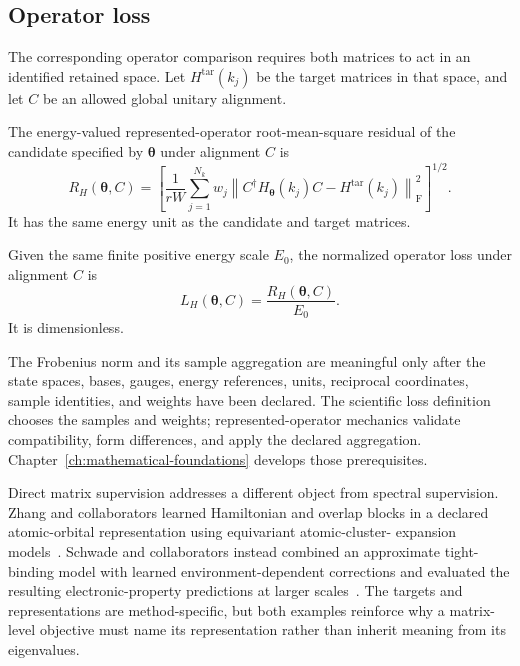 \subsection{Operator loss}

The corresponding operator comparison requires both matrices to act in an
identified retained space. Let $H^{\mathrm{tar}}(k_j)$ be the target matrices
in that space, and let $C$ be an allowed global unitary alignment.

\begin{definition}
The energy-valued represented-operator root-mean-square residual of the
candidate specified by $\boldsymbol\theta$ under alignment $C$ is
\begin{equation}
  R_H(\boldsymbol\theta,C)
  =
  \left[
    \frac{1}{rW}
    \sum_{j=1}^{N_k}w_j
    \left\|
      C^{\dagger}H_{\boldsymbol\theta}(k_j)C
      -H^{\mathrm{tar}}(k_j)
    \right\|_{\mathrm F}^{2}
  \right]^{1/2}.
  \label{eq:admissible-operator-rms-residual}
\end{equation}
It has the same energy unit as the candidate and target matrices.
\end{definition}

\begin{definition}
Given the same finite positive energy scale $E_0$, the normalized operator
loss under alignment $C$ is
\begin{equation}
  L_H(\boldsymbol\theta,C)
  =
  \frac{R_H(\boldsymbol\theta,C)}{E_0}.
  \label{eq:admissible-operator-rms}
\end{equation}
It is dimensionless.
\end{definition}

The Frobenius norm and its sample aggregation are meaningful only after the
state spaces, bases, gauges, energy references, units, reciprocal coordinates,
sample identities, and weights have been declared. The scientific loss
definition chooses the samples and weights; represented-operator mechanics
validate compatibility, form differences, and apply the declared aggregation.
Chapter~\ref{ch:mathematical-foundations} develops those prerequisites.

Direct matrix supervision addresses a different object from spectral
supervision. Zhang and collaborators learned Hamiltonian and overlap blocks in
a declared atomic-orbital representation using equivariant atomic-cluster-
expansion models~\cite{zhangEtAl2022}. Schwade and collaborators instead
combined an approximate tight-binding model with learned environment-dependent
corrections and evaluated the resulting electronic-property predictions at
larger scales~\cite{schwadeEtAl2026}. The targets and representations are
method-specific, but both examples reinforce why a matrix-level objective must
name its representation rather than inherit meaning from its eigenvalues.

